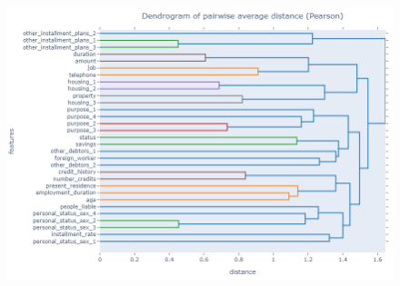 \documentclass[letterpaper]{article}
\begin{document}
	\begin{figure}[h]
		\centering
		\includegraphics[width=.85\textwidth]{images/dendrogram_pearson.png}
		\label{fig:13}
	\end{figure}
	
\end{document}
